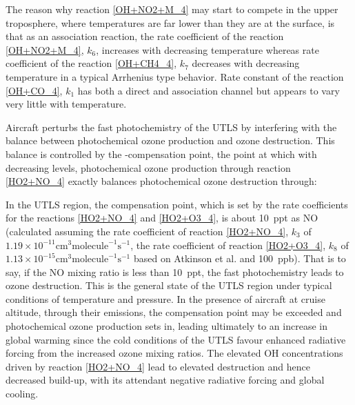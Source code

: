 

The reason why reaction \eqref{OH+NO2+M_4} may start to compete in the upper troposphere, where temperatures are far lower than they are at the surface, is that as an association reaction, the rate coefficient of the reaction \eqref{OH+NO2+M_4}, $k_6$, increases with decreasing temperature \cite{Atkinson2004, Butkovskaya2005} whereas rate coefficient of the reaction \eqref{OH+CH4_4}, $k_7$ decreases with decreasing temperature \cite{Atkinson2003} in a typical Arrhenius type behavior. Rate constant of the reaction \eqref{OH+CO_4}, $k_1$ has both a direct and association channel but appears to vary very little with temperature.

Aircraft  perturbs the fast photochemistry of the UTLS by interfering with the balance between photochemical ozone production and ozone destruction. This balance is controlled by the -compensation point, the point at which with decreasing  levels, photochemical ozone production through reaction \eqref{HO2+NO_4} exactly balances photochemical ozone destruction through:


In the UTLS region, the  compensation point, which is set by the rate coefficients for the reactions \eqref{HO2+NO_4} and \eqref{HO2+O3_4}, is about 10~ppt as NO (calculated assuming the rate coefficient of reaction \eqref{HO2+NO_4}, $k_3$ of $1.19 \times 10^{-11} \text{cm}^3 \text{molecule}^{-1} \text{s}^{-1}$, the rate coefficient of reaction \eqref{HO2+O3_4}, $k_8$ of $1.13 \times 10^{-15} \text{cm}^3 \text{molecule}^{-1} \text{s}^{-1}$ based on Atkinson et al. \cite{Atkinson2004} and  100~ppb). That is to say, if the NO mixing ratio is less than 10~ppt, the fast  photochemistry leads to ozone destruction. This is the general state of the UTLS region under typical conditions of temperature and pressure. In the presence of aircraft at cruise altitude, through their  emissions, the  compensation point may be exceeded and photochemical ozone production sets in, leading ultimately to an increase in global warming since the cold conditions of the UTLS favour enhanced radiative forcing from the increased ozone mixing ratios. The elevated OH concentrations driven by reaction \eqref{HO2+NO_4} lead to elevated  destruction and hence decreased build-up, with its attendant negative radiative forcing and global cooling.

